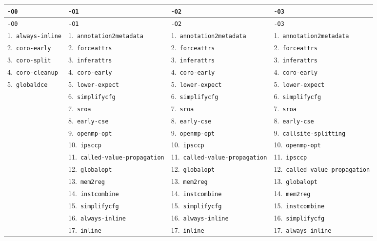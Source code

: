 \documentclass[11pt,a4paper]{article}
\begin{document}
{\fontsize{5.4pt}{6.6pt}\selectfont
\setlength{\tabcolsep}{5pt}
\renewcommand{\arraystretch}{1.15}
\begin{longtable}{llll}
\hline
\texttt{-O0} & \texttt{-O1} & \texttt{-O2} & \texttt{-O3} \\
\hline
\endfirsthead
\hline
\texttt{-O0} & \texttt{-O1} & \texttt{-O2} & \texttt{-O3} \\
\hline
\endhead
1.~\texttt{always-inline} & 1.~\texttt{annotation2metadata} & 1.~\texttt{annotation2metadata} & 1.~\texttt{annotation2metadata} \\
2.~\texttt{coro-early} & 2.~\texttt{forceattrs} & 2.~\texttt{forceattrs} & 2.~\texttt{forceattrs} \\
3.~\texttt{coro-split} & 3.~\texttt{inferattrs} & 3.~\texttt{inferattrs} & 3.~\texttt{inferattrs} \\
4.~\texttt{coro-cleanup} & 4.~\texttt{coro-early} & 4.~\texttt{coro-early} & 4.~\texttt{coro-early} \\
5.~\texttt{globaldce} & 5.~\texttt{lower-expect} & 5.~\texttt{lower-expect} & 5.~\texttt{lower-expect} \\
 & 6.~\texttt{simplifycfg} & 6.~\texttt{simplifycfg} & 6.~\texttt{simplifycfg} \\
 & 7.~\texttt{sroa} & 7.~\texttt{sroa} & 7.~\texttt{sroa} \\
 & 8.~\texttt{early-cse} & 8.~\texttt{early-cse} & 8.~\texttt{early-cse} \\
 & 9.~\texttt{openmp-opt} & 9.~\texttt{openmp-opt} & 9.~\texttt{callsite-splitting} \\
 & 10.~\texttt{ipsccp} & 10.~\texttt{ipsccp} & 10.~\texttt{openmp-opt} \\
 & 11.~\texttt{called-value-propagation} & 11.~\texttt{called-value-propagation} & 11.~\texttt{ipsccp} \\
 & 12.~\texttt{globalopt} & 12.~\texttt{globalopt} & 12.~\texttt{called-value-propagation} \\
 & 13.~\texttt{mem2reg} & 13.~\texttt{mem2reg} & 13.~\texttt{globalopt} \\
 & 14.~\texttt{instcombine} & 14.~\texttt{instcombine} & 14.~\texttt{mem2reg} \\
 & 15.~\texttt{simplifycfg} & 15.~\texttt{simplifycfg} & 15.~\texttt{instcombine} \\
 & 16.~\texttt{always-inline} & 16.~\texttt{always-inline} & 16.~\texttt{simplifycfg} \\
 & 17.~\texttt{inline} & 17.~\texttt{inline} & 17.~\texttt{always-inline} \\

\end{longtable}}
\end{document}
